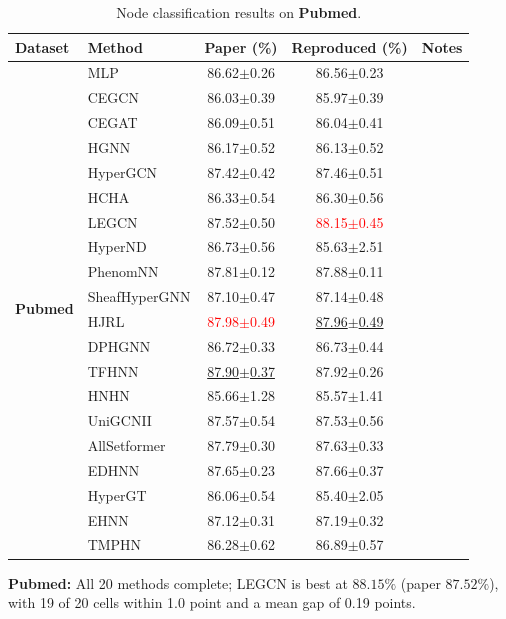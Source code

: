 \documentclass[11pt,a4paper]{article}
\begin{document}
\begin{table}[H]
	\centering\small
	\begin{tabular}{llccc}
		\toprule
		Dataset & Method & Paper (\%) & Reproduced (\%) & Notes \\
		\midrule
		\multirow{20}{*}{\textbf{Pubmed}} & MLP               & 86.62$\pm$0.26   & 86.56$\pm$0.23   &  \\
		 & CEGCN             & 86.03$\pm$0.39   & 85.97$\pm$0.39   &  \\
		 & CEGAT             & 86.09$\pm$0.51   & 86.04$\pm$0.41   &  \\
		 & HGNN              & 86.17$\pm$0.52   & 86.13$\pm$0.52   &  \\
		 & HyperGCN          & 87.42$\pm$0.42   & 87.46$\pm$0.51   &  \\
		 & HCHA              & 86.33$\pm$0.54   & 86.30$\pm$0.56   &  \\
		 & LEGCN             & 87.52$\pm$0.50   & \textcolor{red}{88.15$\pm$0.45}   &  \\
		 & HyperND           & 86.73$\pm$0.56   & 85.63$\pm$2.51   &  \\
		 & PhenomNN          & 87.81$\pm$0.12   & 87.88$\pm$0.11   &  \\
		 & SheafHyperGNN     & 87.10$\pm$0.47   & 87.14$\pm$0.48   &  \\
		 & HJRL              & \textcolor{red}{87.98$\pm$0.49}   & \underline{87.96$\pm$0.49}   &  \\
		 & DPHGNN            & 86.72$\pm$0.33   & 86.73$\pm$0.44   &  \\
		 & TFHNN             & \underline{87.90$\pm$0.37}   & 87.92$\pm$0.26   &  \\
		 & HNHN              & 85.66$\pm$1.28   & 85.57$\pm$1.41   &  \\
		 & UniGCNII          & 87.57$\pm$0.54   & 87.53$\pm$0.56   &  \\
		 & AllSetformer      & 87.79$\pm$0.30   & 87.63$\pm$0.33   &  \\
		 & EDHNN             & 87.65$\pm$0.23   & 87.66$\pm$0.37   &  \\
		 & HyperGT           & 86.06$\pm$0.54   & 85.40$\pm$2.05   &  \\
		 & EHNN              & 87.12$\pm$0.31   & 87.19$\pm$0.32   &  \\
		 & TMPHN             & 86.28$\pm$0.62   & 86.89$\pm$0.57   &  \\
		\bottomrule
	\end{tabular}
	\caption{Node classification results on \textbf{Pubmed}.}
\end{table}
\par\smallskip
\noindent\textbf{Pubmed:} All 20 methods complete; LEGCN is best at $88.15\%$ (paper $87.52\%$), with 19 of 20 cells within 1.0 point and a mean gap of 0.19 points.
\end{document}
